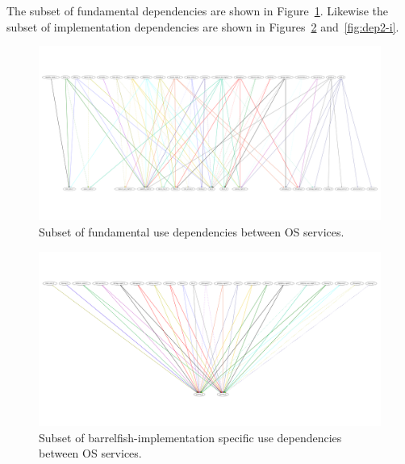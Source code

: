 \documentclass[a4paper,twoside]{report} %
\begin{document}
The subset of fundamental dependencies are shown in
Figure~\ref{fig:dep2-f}. Likewise the subset of implementation
dependencies are shown in Figures~\ref{fig:dep2-b} and~\ref{fig:dep2-i}.

\begin{figure}[hbt]
 \begin{center}
 \includegraphics[angle=270,scale=0.15]{dep2-f-dot.pdf}
 \end{center}
 \caption{Subset of fundamental use dependencies between OS
   services.}\label{fig:dep2-f}  
\end{figure}


\begin{figure}[hbt]
 \begin{center}
 \includegraphics[angle=270,scale=0.15]{dep2-b-dot.pdf}
 \end{center}
 \caption{Subset of barrelfish-implementation specific use
   dependencies between OS services.}\label{fig:dep2-b} 
\end{figure}
\end{document}

